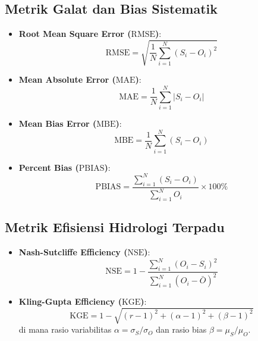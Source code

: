 \documentclass[11pt,a4paper]{article}
\begin{document}
\subsection{Metrik Galat dan Bias Sistematik}
\begin{itemize}[leftmargin=*]
    \item \textbf{Root Mean Square Error ($\text{RMSE}$)}:
    \begin{equation}
        \text{RMSE} = \sqrt{\frac{1}{N} \sum_{i=1}^N (S_i - O_i)^2}
    \end{equation}
    \item \textbf{Mean Absolute Error ($\text{MAE}$)}:
    \begin{equation}
        \text{MAE} = \frac{1}{N} \sum_{i=1}^N |S_i - O_i|
    \end{equation}
    \item \textbf{Mean Bias Error ($\text{MBE}$)}:
    \begin{equation}
        \text{MBE} = \frac{1}{N} \sum_{i=1}^N (S_i - O_i)
    \end{equation}
    \item \textbf{Percent Bias ($\text{PBIAS}$)}:
    \begin{equation}
        \text{PBIAS} = \frac{\sum_{i=1}^N (S_i - O_i)}{\sum_{i=1}^N O_i} \times 100\%
    \end{equation}
\end{itemize}

\subsection{Metrik Efisiensi Hidrologi Terpadu}
\begin{itemize}[leftmargin=*]
    \item \textbf{Nash-Sutcliffe Efficiency ($\text{NSE}$)}:
    \begin{equation}
        \text{NSE} = 1 - \frac{\sum_{i=1}^N (O_i - S_i)^2}{\sum_{i=1}^N (O_i - \bar{O})^2}
    \end{equation}
    \item \textbf{Kling-Gupta Efficiency ($\text{KGE}$)}:
    \begin{equation}
        \text{KGE} = 1 - \sqrt{(r - 1)^2 + (\alpha - 1)^2 + (\beta - 1)^2}
    \end{equation}
    di mana rasio variabilitas $\alpha = \sigma_S / \sigma_O$ dan rasio bias $\beta = \mu_S / \mu_O$.
\end{itemize}
\end{document}
